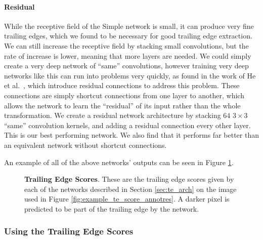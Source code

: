\paragraph{Residual}
While the receptive field of the Simple network is small, it can produce very fine trailing edges, which we found to be necessary for good trailing edge extraction.
We can still increase the receptive field by stacking small convolutions, but the rate of increase is lower, meaning that more layers are needed.
We could simply create a very deep network of ``same'' convolutions, however training very deep networks like this can run into problems very quickly, as found in the work of He et al.\ \cite{he2015deep}, which introduce residual connections to address this problem.
These connections are simply shortcut connections from one layer to another, which allows the network to learn the ``residual'' of its input rather than the whole transformation.
We create a residual network architecture by stacking $64$ $3\times3$ ``same'' convolution kernels, and adding a residual connection every other layer.
This is our best performing network.
We also find that it performs far better than an equivalent network without shortcut connections.

An example of all of the above networks' outputs can be seen in Figure \ref{fig:example_te_scores_all}.

\begin{figure}[t]%
\centering
{}
\newline
{}
\caption{\textbf{Trailing Edge Scores}. These are the trailing edge scores given by each of the networks described in Section \ref{sec:te_arch} on the image used in Figure \ref{fig:example_te_score_annotres}. A darker pixel is predicted to be part of the trailing edge by the network.}
\label{fig:example_te_scores_all}
\end{figure}

\subsubsection{Using the Trailing Edge Scores}

